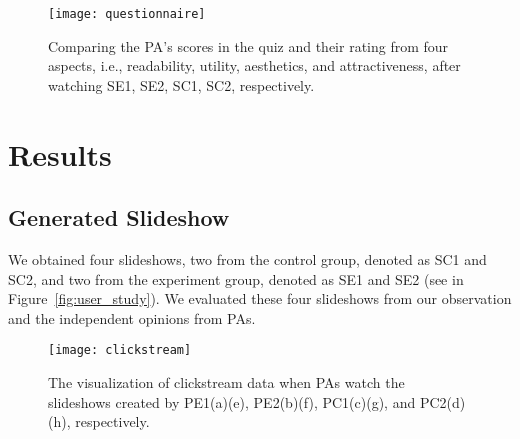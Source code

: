 \begin{figure}
 \centering %
 \texttt{[image: questionnaire]}
 \caption{Comparing the PA's scores in  the quiz and their rating from four aspects, i.e., readability, utility, aesthetics, and attractiveness, after watching SE1, SE2, SC1, SC2, respectively. 
 }
 \label{fig:questionnaire}
\end{figure}

\section{Results}
\subsection{Generated Slideshow}
We obtained four slideshows, two from the control group, denoted as SC1 and SC2, and two from the experiment group, denoted as SE1 and SE2 (see in Figure~\ref{fig:user_study}). We evaluated these four slideshows from our observation and the independent opinions from PAs. 



\begin{figure}
 \centering %
 \texttt{[image: clickstream]}
 \caption{The visualization of clickstream data when PAs watch the slideshows created by PE1(a)(e), PE2(b)(f), PC1(c)(g), and PC2(d)(h), respectively. 
 }
 \label{fig:clickstream}
\end{figure}

